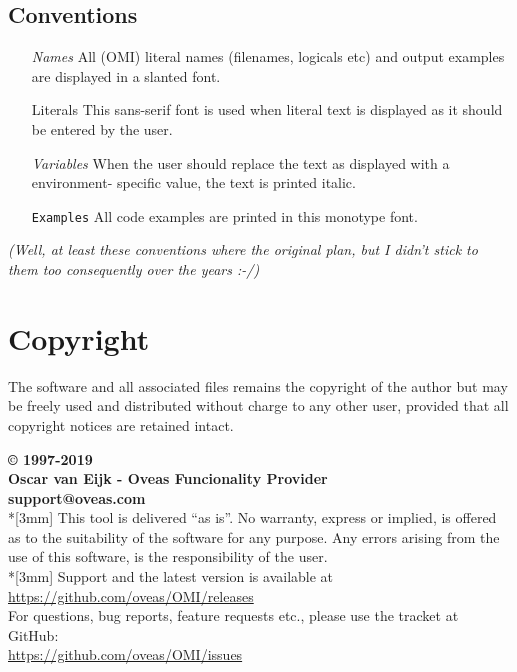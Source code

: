 \documentclass[a4paper]{book}
\renewcommand{\indent}{\hspace*{5mm}}
\begin{document}
\subsection*{Conventions}

\begin{itemize}
\item[\textsl{Names}] All (OMI) literal names (filenames, logicals etc) and output examples are
displayed in a slanted font.
\item[\textsf{Literals}] This sans-serif font is used when literal text is
displayed as it should be entered by the user.
\item[\textsf{\textit{Variables}}] When the user should replace the text as
displayed with a environment- specific value, the text is printed italic.
\item[\texttt{Examples}] All code examples are printed in this monotype font.
\end{itemize}

{\tiny \textit{(Well, at least these conventions where the original plan, but I didn't stick to them too consequently over the years :-/)}}

\section*{Copyright}
\label{subsec:copyrightbrary}

The software and all associated files remains the copyright of the author 
but may be freely used and distributed without charge to any other user, 
provided that all copyright notices are retained intact.

\noindent\textbf{{\copyright} 1997-2019\\
Oscar van Eijk - Oveas Funcionality Provider\\
support@oveas.com}\\*[3mm]
This tool is delivered ``as is''. No warranty, express or implied, is 
offered as to the suitability of the software for any purpose. Any errors 
arising from the use of this software, is the responsibility of the user.\\*[3mm]
Support and the latest version is available at \\
\indent\url{https://github.com/oveas/OMI/releases} \\
For questions, bug reports, feature requests etc., please use the tracket at GitHub: \\
\indent\url{https://github.com/oveas/OMI/issues}
\end{document}
